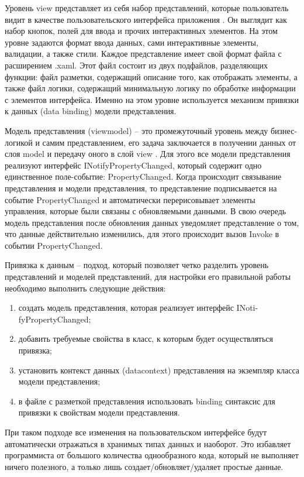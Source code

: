 Уровень view представляет из себя набор представлений, которые пользователь видит в качестве пользовательского интерфейса приложения \cite{book_mvvm}. Он выглядит как набор кнопок, полей для ввода 
и прочих интерактивных элементов. На этом уровне задаются формат ввода данных, сами интерактивные элементы, валидации, а также стили. Каждое представление имеет свой формат файла 
с расширением .xaml. Этот файл состоит из двух подфайлов, разделяющих функции: файл разметки, содержащий описание того, как отображать элементы, а также файл логики, содержащий
минимальную логику по обработке информации с элементов интерфейса. Именно на этом уровне используется механизм привязки к данных (data binding) модели представления.

Модель представления (viewmodel) -- это промежуточный уровень между бизнес-логикой и самим представлением, его задача заключается в получении данных от слоя model и передачу оного в слой view \cite{book_mvvm}.
Для этого все модели представления реализуют интерфейс INotifyPropertyChanged, который содержит одно единственное поле-событие: PropertyChanged. Когда происходит связывание представления
и модели представления, то представление подписывается на событие PropertyChanged и автоматически перерисовывает элементы управления, которые были связаны с обновляемыми данными. В свою
очередь модель представления после обновления данных уведомляет представление о том, что данные действительно изменились, для этого происходит вызов Invoke в событии PropertyChanged. 

Привязка к данным -- подход, который позволяет четко разделить уровень представлений и моделей представлений, для настройки его правильной работы необходимо выполнить следующие
действия:

\begin{enumerate}
	\item создать модель представления, которая реализует интерфейс INoti-fyPropertyChanged;
	\item добавить требуемые свойства в класс, к которым будет осуществляться привязка;
	\item установить контекст данных (datacontext) представления на экземпляр класса модели представления;
	\item в файле с разметкой представления использовать binding синтаксис для привязки к свойствам модели представления.
\end{enumerate}

При таком подходе все изменения на пользовательском интерфейсе будут автоматически отражаться в хранимых типах данных и наоборот. Это избавляет программиста от большого количества
однообразного кода, который не выполняет ничего полезного, а только лишь создает/обновляет/удаляет простые данные.

